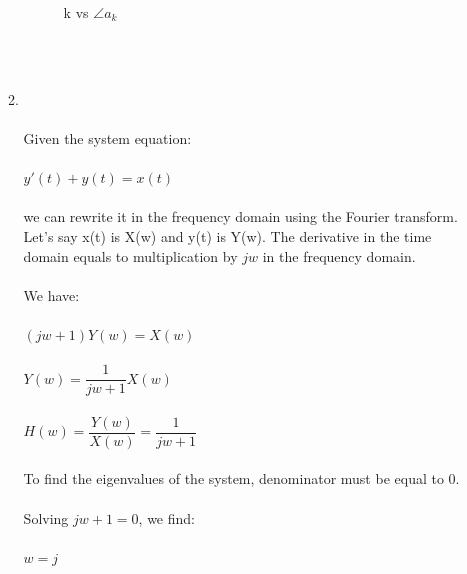 \documentclass[10pt,a4paper, margin=1in]{article}
\begin{document}
\begin{enumerate}
\begin{enumerate}
        \begin{figure} [H]
            \centering
            \caption{k vs $\angle a_k$}
            \label{fig:q4a_2}
        \end{figure}
        \\\\
    \item %
        \\\\Given the system equation:
        \\\\ $y'(t) + y(t) = x(t)$
        \\\\  we can rewrite it in the frequency domain using the Fourier transform. Let's say x(t) is X(w) and y(t) is Y(w). The derivative in the time domain equals to multiplication by $jw$ in the frequency domain. 
        \\\\ We have: 
        \\\\ $(jw+1) Y(w) = X(w)$
        \\\\ $Y(w)=\dfrac{1}{jw+1}X(w)$
        \\\\ $H(w) = \dfrac{Y(w)}{X(w)} = \dfrac{1}{jw+1}$
        \\\\ To find the eigenvalues of the system, denominator must be equal to 0.
        \\\\ Solving $jw+1 = 0$, we find:
        \\\\ $w = j$

\end{enumerate}
\end{enumerate}
\end{document}
